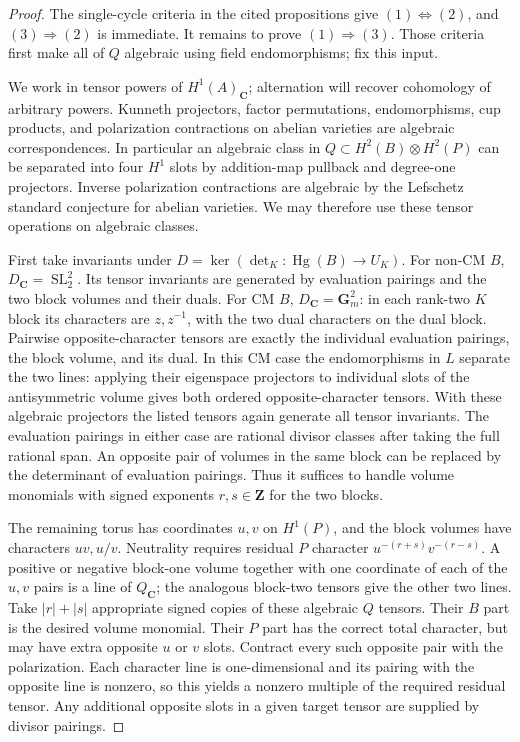 \documentclass[10pt,reqno]{article}
\theoremstyle{emphasizedplain}
\theoremstyle{emphasizeddefinition}
\theoremstyle{emphasizeddefinition}
\DeclareMathOperator{\Hg}{Hg}
\DeclareMathOperator{\SL}{SL}
\newcommand{\C}{\mathbf C}
\newcommand{\Z}{\mathbf Z}
\begin{document}
\begin{proof}
The single-cycle criteria in the cited propositions give
$(1)\Longleftrightarrow(2)$, and $(3)\Longrightarrow(2)$ is immediate.
It remains to prove $(1)\Longrightarrow(3)$. Those criteria first make
all of $Q$ algebraic using field endomorphisms; fix this input.

We work in tensor powers of $H^1(A)_\C$; alternation will recover
cohomology of arbitrary powers. Kunneth projectors, factor permutations,
endomorphisms, cup products, and polarization contractions on abelian
varieties are algebraic correspondences. In particular an algebraic
class in $Q\subset H^2(B)\otimes H^2(P)$ can be separated into four
$H^1$ slots by addition-map pullback and degree-one projectors.
Inverse polarization contractions are algebraic by the Lefschetz
standard conjecture for abelian varieties. We may therefore use these
tensor operations on algebraic classes.

First take invariants under $D=\ker(\det_K:\Hg(B)\to U_K)$.
For non-CM $B$, $D_\C=\SL_2^2$. Its tensor invariants are generated
by evaluation pairings and the two block volumes and their duals.
For CM $B$, $D_\C=\mathbf G_m^2$: in each rank-two $K$ block its
characters are $z,z^{-1}$, with the two dual characters on the dual
block. Pairwise opposite-character tensors are exactly the individual
evaluation pairings, the block volume, and its dual. In this CM case the endomorphisms
in $L$ separate the two lines: applying their eigenspace projectors
to individual slots of the antisymmetric volume gives both ordered
opposite-character tensors. With these algebraic projectors the
listed tensors again generate all tensor invariants. The evaluation pairings in either
case are rational divisor classes after taking the full rational span.
An opposite pair of volumes in the same block can be replaced by the
determinant of evaluation pairings. Thus it suffices to handle volume
monomials with signed exponents $r,s\in\Z$ for the two blocks.

The remaining torus has coordinates $u,v$ on $H^1(P)$, and the block
volumes have characters $uv,u/v$. Neutrality requires residual $P$
character $u^{-(r+s)}v^{-(r-s)}$. A positive or negative block-one
volume together with one coordinate of each of the $u,v$ pairs is a
line of $Q_\C$; the analogous block-two tensors give the other two
lines. Take $|r|+|s|$ appropriate signed copies of these algebraic
$Q$ tensors. Their $B$ part is the desired volume monomial.
Their $P$ part has the correct total character, but may have extra
opposite $u$ or $v$ slots. Contract every such opposite pair with the
polarization. Each character line is one-dimensional and its pairing
with the opposite line is nonzero, so this yields a nonzero multiple
of the required residual tensor. Any additional opposite slots in a
given target tensor are supplied by divisor pairings.


\end{proof}
\end{document}
